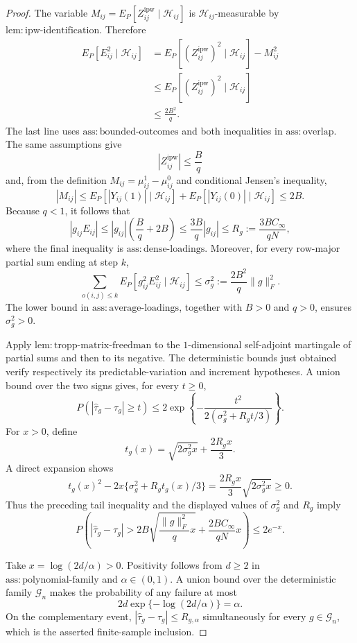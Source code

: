 \documentclass{article}
\begin{document}
\begin{proof}
The variable \(M_{ij}=E_P[Z^{\mathrm{ipw}}_{ij}\mid\mathcal H_{ij}]\) is \(\mathcal H_{ij}\)-measurable by \(\mathrm{lem:ipw\mbox{-}identification}\).  Therefore
\[
\begin{aligned}
 E_P[E_{ij}^2\mid\mathcal H_{ij}]
 &=E_P[(Z^{\mathrm{ipw}}_{ij})^2\mid\mathcal H_{ij}]-M_{ij}^2\\
 &\le E_P[(Z^{\mathrm{ipw}}_{ij})^2\mid\mathcal H_{ij}]\\
 &\le \frac{2B^2}{q}.
\end{aligned}
\]
The last line uses \(\mathrm{ass:bounded\mbox{-}outcomes}\) and both inequalities in \(\mathrm{ass:overlap}\).  The same assumptions give
\[
 |Z^{\mathrm{ipw}}_{ij}|\le \frac{B}{q}
\]
and, from the definition \(M_{ij}=\mu^1_{ij}-\mu^0_{ij}\) and conditional Jensen's inequality,
\[
 |M_{ij}|
 \le E_P[|Y_{ij}(1)|\mid\mathcal H_{ij}]
     +E_P[|Y_{ij}(0)|\mid\mathcal H_{ij}]
 \le 2B.
\]
Because \(q<1\), it follows that
\[
 |g_{ij}E_{ij}|
 \le |g_{ij}|\left(\frac{B}{q}+2B\right)
 \le \frac{3B}{q}|g_{ij}|
 \le R_g:=\frac{3BC_\infty}{qN},
\]
where the final inequality is \(\mathrm{ass:dense\mbox{-}loadings}\).  Moreover, for every row-major partial sum ending at step \(k\),
\[
 \sum_{o(i,j)\le k}E_P[g_{ij}^2E_{ij}^2\mid\mathcal H_{ij}]
 \le \sigma_g^2:=\frac{2B^2}{q}\lVert g\rVert_F^2.
\]
The lower bound in \(\mathrm{ass:average\mbox{-}loadings}\), together with \(B>0\) and \(q>0\), ensures \(\sigma_g^2>0\).

Apply \(\mathrm{lem:tropp\mbox{-}matrix\mbox{-}freedman}\) to the \(1\)-dimensional self-adjoint martingale of partial sums and then to its negative.  The deterministic bounds just obtained verify respectively its predictable-variation and increment hypotheses.  A union bound over the two signs gives, for every \(t\ge0\),
\[
 P\!\left(\left|\widehat\tau_g-\tau_g\right|\ge t\right)
 \le 2\exp\!\left\{-\frac{t^2}{2(\sigma_g^2+R_gt/3)}\right\}.
\]
For \(x>0\), define
\[
 t_g(x)=\sqrt{2\sigma_g^2x}+\frac{2R_gx}{3}.
\]
A direct expansion shows
\[
 t_g(x)^2-2x\{\sigma_g^2+R_gt_g(x)/3\}
 =\frac{2R_gx}{3}\sqrt{2\sigma_g^2x}\ge0.
\]
Thus the preceding tail inequality and the displayed values of \(\sigma_g^2\) and \(R_g\) imply
\[
 P\!\left(
 |\widehat\tau_g-\tau_g|>
 2B\sqrt{\frac{\lVert g\rVert_F^2}{q}x}
 +\frac{2BC_\infty}{qN}x
 \right)\le2e^{-x}.
\]

Take \(x=\log(2d/\alpha)>0\).  Positivity follows from \(d\ge2\) in \(\mathrm{ass:polynomial\mbox{-}family}\) and \(\alpha\in(0,1)\).  A union bound over the deterministic family \(\mathcal G_n\) makes the probability of any failure at most
\[
 2d\exp\{-\log(2d/\alpha)\}=\alpha.
\]
On the complementary event, \(|\widehat\tau_g-\tau_g|\le R_{g,\alpha}\) simultaneously for every \(g\in\mathcal G_n\), which is the asserted finite-sample inclusion.


\end{proof}
\end{document}
